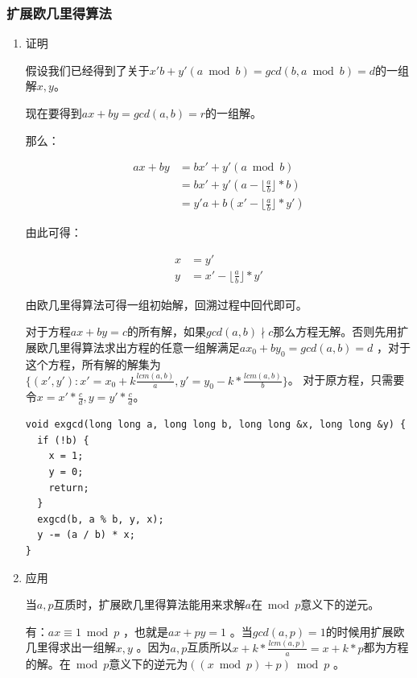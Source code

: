 \documentclass[11pt]{article}
\begin{document}
\subsubsection{扩展欧几里得算法}
\label{sec:org9d5902f}
\begin{enumerate}
\item 证明
\label{sec:org08464a9}

假设我们已经得到了关于\(x'b+y'(a \bmod b)=gcd(b,a \bmod b)=d\)的一组解\(x,y\)。

现在要得到\(ax+by=gcd(a,b)=r\)的一组解。

那么：

\[\begin{aligned}
a x + b y &= b x' + y' (a \bmod b)\\
&= bx' + y'(a - \lfloor \frac{a}{b} \rfloor * b) \\
&= y'a + b(x' - \lfloor \frac{a}{b} \rfloor*y')
\end{aligned}\]

由此可得：

\[\begin{aligned}
x &= y'\\
y &= x' - \lfloor \frac{a}{b} \rfloor * y'
\end{aligned}\]

由欧几里得算法可得一组初始解，回溯过程中回代即可。

对于方程\(ax+by=c\)的所有解，如果\(gcd(a,b) \nmid c\)那么方程无解。否则先用扩展欧几里得算法求出方程的任意一组解满足\(ax_0+by_0=gcd(a,b)=d\) ，对于这个方程，所有解的解集为\(\{(x',y'): x' = x_0 + k \frac{lcm(a,b)}{a}, y'=y_0-k*\frac{lcm(a,b)}{b}\}\)。 对于原方程，只需要令\(x=x'*\frac{c}{d},y=y'*\frac{c}{d}\)。 

\begin{verbatim}
void exgcd(long long a, long long b, long long &x, long long &y) {
  if (!b) {
    x = 1;
    y = 0;
    return;
  }
  exgcd(b, a % b, y, x);
  y -= (a / b) * x;
}
\end{verbatim}

\item 应用
\label{sec:org42edaba}

当\(a, p\)互质时，扩展欧几里得算法能用来求解\(a\)在\(\bmod p\)意义下的逆元。

有：\(ax \equiv 1 \bmod p\) ，也就是\(ax + py = 1\) 。当\(gcd(a,p)=1\)的时候用扩展欧几里得求出一组解\(x,y\) 。因为\(a,p\)互质所以\(x+k* \frac{lcm(a,p)}{a} = x + k * p\)都为方程的解。在\(\bmod p\)意义下的逆元为\(((x \bmod p) + p) \bmod p\) 。
\end{enumerate}
\end{document}
